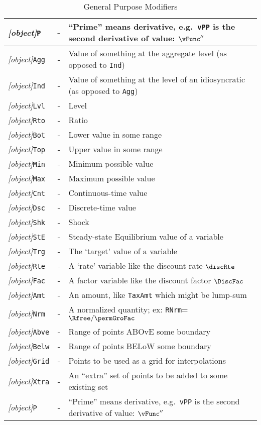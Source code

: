 \documentclass[12pt]{\econtex}
\begin{document}
\begin{table}[ht]
  \centering
  \begin{tabular}{|>{\ttfamily}lcl|}
    \hline
 \textit{[object]}\texttt{P} & - & ``Prime'' means derivative, e.g.\ \texttt{vPP} is the second derivative of value: $\vFunc^{\prime\prime}$
\\    \hline
    \textit{[object]}\texttt{Agg} & - & Value of something at the aggregate level (as opposed to \texttt{Ind})
    \\ \textit{[object]}\texttt{Ind} & - & Value of something at the level of an idiosyncratic (as opposed to \texttt{Agg})
    \\ \textit{[object]}\texttt{Lvl} & - & Level 
    \\ \textit{[object]}\texttt{Rto} & - & Ratio 
    \\ \textit{[object]}\texttt{Bot} & - & Lower value in some range 
    \\ \textit{[object]}\texttt{Top} & - & Upper value in some range 
    \\ \textit{[object]}\texttt{Min} & - & Minimum possible value 
    \\ \textit{[object]}\texttt{Max} & - & Maximum possible value 
    \\ \textit{[object]}\texttt{Cnt} & - & Continuous-time value
    \\ \textit{[object]}\texttt{Dsc} & - & Discrete-time value
    \\ \textit{[object]}\texttt{Shk} & - & Shock 
    \\ \textit{[object]}\texttt{StE} & - & Steady-state Equilibrium value of a variable
    \\ \textit{[object]}\texttt{Trg} & - & The `target' value of a variable 
    \\ \textit{[object]}\texttt{Rte} & - & A `rate' variable like the discount rate $\discRte$
    \\ \textit{[object]}\texttt{Fac} & - & A factor variable like the discount factor $\DiscFac$
    \\ \textit{[object]}\texttt{Amt} & - & An amount, like \texttt{TaxAmt} which might be lump-sum
    \\ \textit{[object]}\texttt{Nrm} & - & A normalized quantity; ex: \texttt{RNrm}=$\Rfree/\permGroFac$
    \\ \textit{[object]}\texttt{Abve} & - & Range of points ABOvE some boundary
    \\ \textit{[object]}\texttt{Belw} & - & Range of points BELoW some boundary
    \\ \textit{[object]}\texttt{Grid} & - & Points to be used as a grid for interpolations
    \\ \textit{[object]}\texttt{Xtra} & - & An ``extra'' set of points to be added to some existing set
\\ \textit{[object]}\texttt{P} & - & ``Prime'' means derivative, e.g.\ \texttt{vPP} is the second derivative of value: $\vFunc^{\prime\prime}$
\\    \hline
  \end{tabular}
  \caption{General Purpose Modifiers}
  \label{table:General}
\end{table}	
\end{document}
